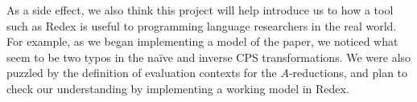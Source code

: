 \documentclass[11pt]{article}
\begin{document}
As a side effect, we also think this project will help introduce us to how a
tool such as Redex is useful to programming language researchers in the
real world. For example, as we began implementing a model of the paper,
we noticed what seem to be two typos in the na\"{i}ve and inverse CPS
transformations. We were also puzzled by the definition of evaluation contexts
for the $A$-reductions, and plan to check our understanding by implementing a
working model in Redex.
%

\end{document}
